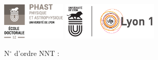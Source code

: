 \begin{titlepage}


\begin{center}
	\large
	
	\includegraphics[height=1.8cm]{./FrontBackMatter/phast-logo.png}
	\includegraphics[height=1.8cm]{./FrontBackMatter/Planche_UdL_LogoLyon1Sig_CoulCmjnVecto-eps-converted-to.pdf}
	\hfill
	
    \vspace{-0.5\baselineskip}
	\begin{flushleft}
	{\footnotesize N$^\circ$ d'ordre NNT : }
	\end{flushleft}


	

	\vspace{\baselineskip}
	
	\vspace{-0.5\baselineskip}
	
	
	
	\vspace{1.5\baselineskip} 
	

\end{center}
\end{titlepage}
